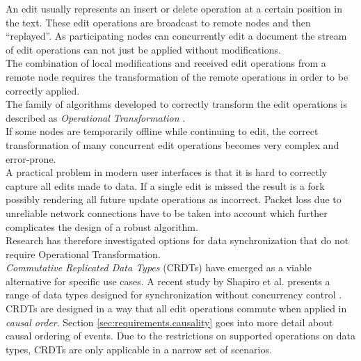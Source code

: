 An edit usually represents an insert or delete operation at a certain position in the text.
These edit operations are broadcast to remote nodes and then ``replayed''.
As participating nodes can concurrently edit a document the stream of edit operations can not just be applied without modifications.\\
The combination of local modifications and received edit operations from a remote node requires the transformation of the remote operations in order to be correctly applied.\\
The family of algorithms developed to correctly transform the edit operations is described as \emph{Operational Transformation} \cite{Ellis:1998vf}.\\
If some nodes are temporarily offline while continuing to edit, the correct transformation of many concurrent edit operations becomes very complex and error-prone.\\
A practical problem in modern user interfaces is that it is hard to correctly capture all edits made to data.
If a single edit is missed the result is a fork possibly rendering all future update operations as incorrect.
Packet loss due to unreliable network connections have to be taken into account which further complicates the design of a robust algorithm.\\
Research has therefore investigated options for data synchronization that do not require Operational Transformation.\\

\emph{Commutative Replicated Data Types} (CRDTs) have emerged as a viable alternative for specific use cases.
A recent study by Shapiro et al. presents a range of data types designed for synchronization without concurrency control \cite{Shapiro:2011wy}.\\
CRDTs are designed in a way that all edit operations commute when applied in \emph{causal order}.
Section \ref{sec:requirements.causality} goes into more detail about causal ordering of events.
Due to the restrictions on supported operations on data types, CRDTs are only applicable in a narrow set of scenarios.

